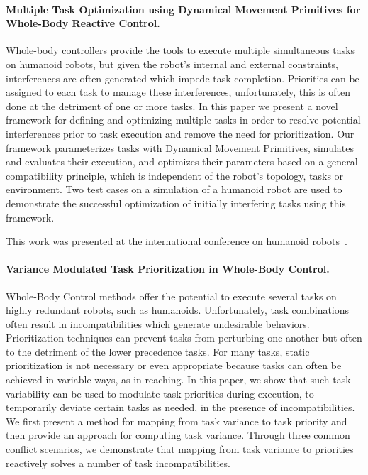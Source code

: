 \documentclass[12pt,a4paper,twoside]{report}
\begin{document}
\paragraph*{Multiple Task Optimization using Dynamical Movement Primitives for Whole-Body Reactive Control.}
Whole-body controllers provide the tools to execute
multiple simultaneous tasks on humanoid robots, but
given the robot’s internal and external constraints, interferences
are often generated which impede task completion. Priorities
can be assigned to each task to manage these interferences,
unfortunately, this is often done at the detriment of one or
more tasks. In this paper we present a novel framework for
defining and optimizing multiple tasks in order to resolve
potential interferences prior to task execution and remove the
need for prioritization. Our framework parameterizes tasks
with Dynamical Movement Primitives, simulates and evaluates
their execution, and optimizes their parameters based on a
general compatibility principle, which is independent of the
robot’s topology, tasks or environment. Two test cases on a
simulation of a humanoid robot are used to demonstrate the
successful optimization of initially interfering tasks using this
framework. 

This work was presented at the international conference on humanoid robots~\cite{lober-HUMANOIDS2014}.

\paragraph*{Variance Modulated Task Prioritization in Whole-Body Control.}
Whole-Body Control methods offer the potential
to execute several tasks on highly redundant robots, such as
humanoids. Unfortunately, task combinations often result in
incompatibilities which generate undesirable behaviors. Prioritization
techniques can prevent tasks from perturbing one
another but often to the detriment of the lower precedence
tasks. For many tasks, static prioritization is not necessary
or even appropriate because tasks can often be achieved in
variable ways, as in reaching. In this paper, we show that such
task variability can be used to modulate task priorities during
execution, to temporarily deviate certain tasks as needed, in
the presence of incompatibilities. We first present a method
for mapping from task variance to task priority and then
provide an approach for computing task variance. Through
three common conflict scenarios, we demonstrate that mapping
from task variance to priorities reactively solves a number of
task incompatibilities.
\end{document}
